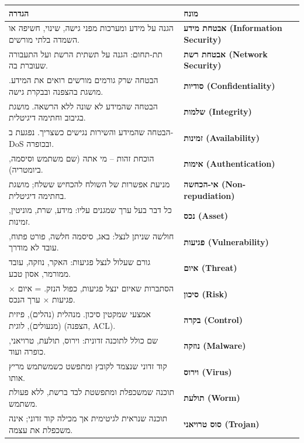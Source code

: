 \documentclass[11pt]{article}
\newcommand{\enLR}[1]{\textenglish{#1}}
\begin{document}
\begin{xltabular}{\linewidth}{|>{\setRTL\raggedleft\arraybackslash}X|>{\setRTL\raggedleft\arraybackslash}X|}
\hline
{}\textbf{הגדרה} & \textbf{מונח} \\
\hline
\endhead
הגנה על מידע ומערכות מפני גישה, שינוי, חשיפה או השמדה בלתי מורשים. & \textbf{אבטחת מידע \enLR{(Information Security)}} \\
\hline
תת-תחום: הגנה על תשתית הרשת ועל התעבורה שעוברת בה. & \textbf{אבטחת רשת \enLR{(Network Security)}} \\
\hline
הבטחה שרק גורמים מורשים רואים את המידע. מושגת בהצפנה ובבקרת גישה. & \textbf{סודיות \enLR{(Confidentiality)}} \\
\hline
הבטחה שהמידע לא שונה ללא הרשאה. מושגת בגיבוב וחתימה דיגיטלית. & \textbf{שלמות \enLR{(Integrity)}} \\
\hline
הבטחה שהמידע והשירות נגישים כשצריך. נפגעת ב-\enLR{DoS} ובכופרה. & \textbf{זמינות \enLR{(Availability)}} \\
\hline
הוכחת זהות – מי אתה (שם משתמש וסיסמה, ביומטריה). & \textbf{אימות \enLR{(Authentication)}} \\
\hline
מניעת אפשרות של השולח להכחיש ששלח; מושגת בחתימה דיגיטלית. & \textbf{אי-הכחשה \enLR{(Non-repudiation)}} \\
\hline
כל דבר בעל ערך שמגנים עליו: מידע, שרת, מוניטין, זמינות. & \textbf{נכס \enLR{(Asset)}} \\
\hline
חולשה שניתן לנצל: באג, סיסמה חלשה, פורט פתוח, עובד לא מודרך. & \textbf{פגיעות \enLR{(Vulnerability)}} \\
\hline
גורם שעלול לנצל פגיעות: האקר, נוזקה, עובד ממורמר, אסון טבע. & \textbf{איום \enLR{(Threat)}} \\
\hline
הסתברות שאיום ינצל פגיעות, כפול הנזק. = איום × פגיעות × ערך הנכס. & \textbf{סיכון \enLR{(Risk)}} \\
\hline
אמצעי שמקטין סיכון. מנהלית (נהלים), פיזית (מנעולים), לוגית (הצפנה, \enLR{ACL).} & \textbf{בקרה \enLR{(Control)}} \\
\hline
שם כולל לתוכנה זדונית: וירוס, תולעת, טרויאני, כופרה ועוד. & \textbf{נוזקה \enLR{(Malware)}} \\
\hline
קוד זדוני שנצמד לקובץ ומתפשט כשמשתמש מריץ אותו. & \textbf{וירוס \enLR{(Virus)}} \\
\hline
תוכנה שמשכפלת ומתפשטת לבד ברשת, ללא פעולת משתמש. & \textbf{תולעת \enLR{(Worm)}} \\
\hline
תוכנה שנראית לגיטימית אך מכילה קוד זדוני; אינה משכפלת את עצמה. & \textbf{סוס טרויאני \enLR{(Trojan)}} \\

\end{xltabular}
\end{document}
